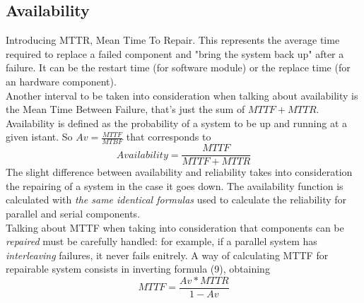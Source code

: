 \documentclass[10pt,a4paper]{article}
\begin{document}
			\subsection{Availability}
				Introducing MTTR, Mean Time To Repair. This represents the average time required to replace a failed component and "bring the system back up" after a failure. It can be the restart time (for software module) or the replace time (for an hardware component).\\
				Another interval to be taken into consideration when talking about availability is the Mean Time Between Failure, that's just the sum of $MTTF + MTTR$. Availability is defined as the probability of a system to be up and running at a given istant. So $Av = \frac{MTTF}{MTBF}$ that corresponds to
				\begin{equation}
					Availability = \frac{MTTF}{MTTF+MTTR}
				\end{equation}
				The slight difference between availability and reliability takes into consideration the repairing of a system in the case it goes down. The availability function is calculated with \emph{the same identical formulas} used to calculate the reliability for parallel and serial components.\\
				Talking about MTTF when taking into consideration that components can be \emph{repaired} must be carefully handled: for example, if a parallel system has \emph{interleaving} failures, it never fails enitrely. A way of calculating MTTF for repairable system consists in inverting formula (9), obtaining
				\begin{equation}
					MTTF = \frac{Av*MTTR}{1-Av}
				\end{equation}
\end{document}
